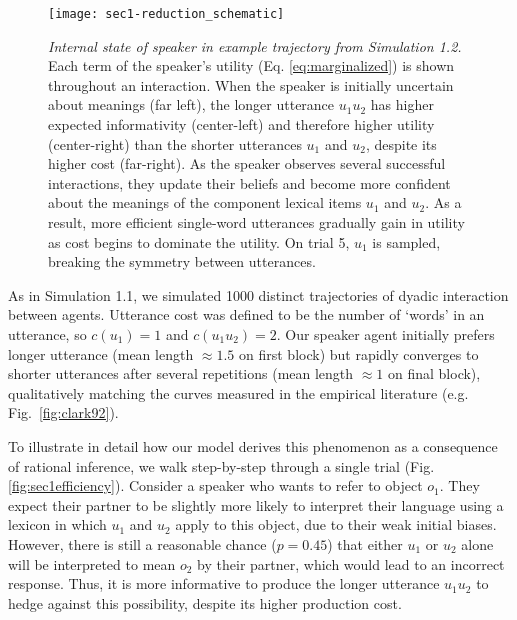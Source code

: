 

\begin{figure*}[t]
\centering
    \texttt{[image: sec1-reduction\_schematic]}
    \vspace{1em}
  \caption{\emph{Internal state of speaker in example trajectory from Simulation 1.2.} Each term of the speaker's utility (Eq. \ref{eq:marginalized}) is shown throughout an interaction. When the speaker is initially uncertain about meanings (far left), the longer utterance $u_1u_2$ has higher expected informativity (center-left) and therefore higher utility (center-right) than the shorter utterances $u_1$ and $u_2$, despite its higher cost (far-right). As the speaker observes several successful interactions, they update their beliefs and become more confident about the meanings of the component lexical items $u_1$ and $u_2$. As a result, more efficient single-word utterances gradually gain in utility as cost begins to dominate the utility. On trial 5, $u_1$ is sampled, breaking the symmetry between utterances.}
  \label{fig:sec1internals}
\end{figure*}

As in Simulation 1.1, we simulated 1000 distinct trajectories of dyadic interaction between agents.
Utterance cost was defined to be the number of `words' in an utterance, so $c(u_1) =1$ and $c(u_1u_2)=2$.
Our speaker agent initially prefers longer utterance (mean length $\approx 1.5$ on first block) but rapidly converges to shorter utterances after several repetitions (mean length $\approx 1$ on final block), qualitatively matching the curves measured in the empirical literature (e.g. Fig.~\ref{fig:clark92}).

To illustrate in detail how our model derives this phenomenon as a consequence of rational inference, we walk step-by-step through a single trial (Fig. \ref{fig:sec1efficiency}).
Consider a speaker who wants to refer to object $o_1$. 
They expect their partner to be slightly more likely to interpret their language using a lexicon in which $u_{1}$ and $u_{2}$ apply to this object, due to their weak initial biases. 
However, there is still a reasonable chance ($p=0.45$) that either $u_1$ or $u_2$ alone will be interpreted to mean $o_2$ by their partner, which would lead to an incorrect response. 
Thus, it is more informative to produce the longer utterance $u_{1}u_{2}$ to hedge against this possibility, despite its higher production cost. 

